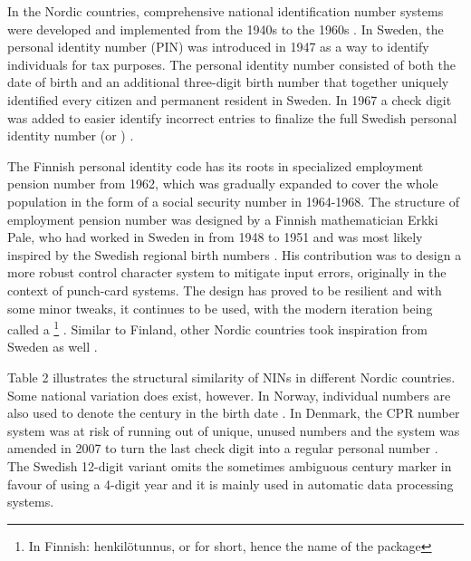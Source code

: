 In the Nordic countries, comprehensive national identification number systems were developed and implemented from the 1940s to the 1960s \citep{watson2010}. In Sweden, the personal identity number (PIN) was introduced in 1947 as a way to identify individuals for tax purposes. The personal identity number consisted of both the date of birth and an additional three-digit birth number that together uniquely identified every citizen and permanent resident in Sweden. In 1967 a check digit was added to easier identify incorrect entries to finalize the full Swedish personal identity number (or ) \citep{johansson2003,scb2016}. 

The Finnish personal identity code has its roots in specialized employment pension number from 1962, which was gradually expanded to cover the whole population in the form of a social security number in 1964-1968. The structure of employment pension number was designed by a Finnish mathematician Erkki Pale, who had worked in Sweden in from 1948 to 1951 and was most likely inspired by the Swedish regional birth numbers \citep{alastalo2022}. His contribution was to design a more robust control character system to mitigate input errors, originally in the context of punch-card systems. The design has proved to be resilient and with some minor tweaks, it continues to be used, with the modern iteration being called a \footnote{In Finnish: henkilötunnus, or  for short, hence the name of the package} \citep{salste2021}. Similar to Finland, other Nordic countries took inspiration from Sweden as well \citep{Krogness2011}. 

Table 2 illustrates the structural similarity of NINs in different Nordic countries. Some national variation does exist, however. In Norway, individual numbers are also used to denote the century in the birth date \citep{furseth2015}. In Denmark, the CPR number system was at risk of running out of unique, unused numbers and the system was amended in 2007 to turn the last check digit into a regular personal number \citep{cpr2008, jerlach2009}. The Swedish 12-digit variant omits the sometimes ambiguous century marker in favour of using a 4-digit year and it is mainly used in automatic data processing systems.

